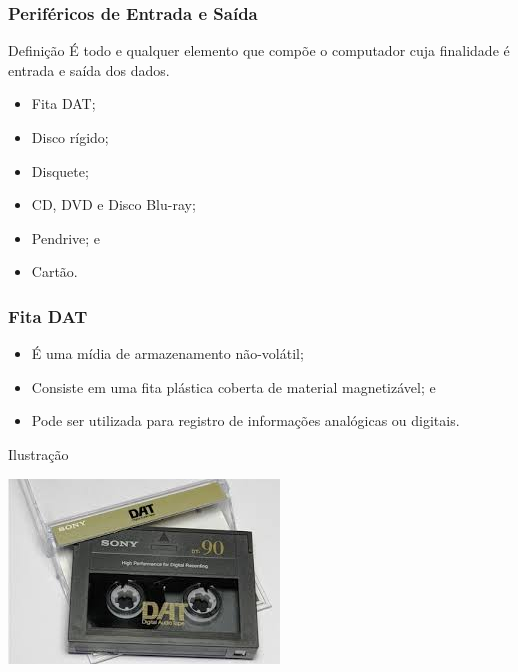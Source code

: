 \documentclass[aspectratio=169]{beamer} %
\begin{document}
\begin{frame}
	\frametitle{Periféricos de Entrada e Saída}
	
	\begin{block}{Defini\c cão}
		É todo e qualquer elemento que compõe o computador cuja finalidade é entrada e saída dos dados.
	\end{block}\vfill
	
	\begin{itemize}
		\item Fita DAT;
		\item Disco rígido;
		\item Disquete;
		\item CD, DVD e Disco Blu-ray; 
		\item Pendrive; e
		\item Cartão.
	\end{itemize}
\end{frame}

\begin{frame}
	\frametitle{Fita DAT}
		
	\begin{itemize}
		\item É uma mídia de armazenamento não-volátil;
		\item Consiste em uma fita plástica coberta de material magnetizável; e 
		\item Pode ser utilizada para registro de informações analógicas ou digitais.
	\end{itemize}\vfill
	
	\begin{exampleblock}{Ilustra\c cão}
		\begin{center}
			\includegraphics[scale=0.4]{img/fita_dat}
		\end{center}		
	\end{exampleblock}
\end{frame}
\end{document}

